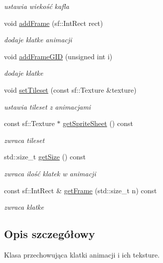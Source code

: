 \begin{DoxyCompactItemize}
\begin{DoxyCompactList}\small\item\em ustawia wiekość kafla \end{DoxyCompactList}\item 
void \hyperlink{class_animation_a486ee5fa2d40ae90f227a19866998c91}{add\-Frame} (sf\-::\-Int\-Rect rect)
\begin{DoxyCompactList}\small\item\em dodaje klatke animacji \end{DoxyCompactList}\item 
void \hyperlink{class_animation_ad55efa0c04a03239a8c176f1710b7a9b}{add\-Frame\-G\-I\-D} (unsigned int i)
\begin{DoxyCompactList}\small\item\em dodaje klatke \end{DoxyCompactList}\item 
void \hyperlink{class_animation_a8528dea500d55c9849ab6d3c30ae15eb}{set\-Tileset} (const sf\-::\-Texture \&texture)
\begin{DoxyCompactList}\small\item\em ustawia tileset z animacjami \end{DoxyCompactList}\item 
const sf\-::\-Texture $\ast$ \hyperlink{class_animation_aafed5696c35b893bb721aa1303d5e84f}{get\-Sprite\-Sheet} () const 
\begin{DoxyCompactList}\small\item\em zwraca tileset \end{DoxyCompactList}\item 
std\-::size\-\_\-t \hyperlink{class_animation_aa8dc627c1800fcad9b9e53c9a102ded3}{get\-Size} () const 
\begin{DoxyCompactList}\small\item\em zwraca ilość klatek w animacji \end{DoxyCompactList}\item 
const sf\-::\-Int\-Rect \& \hyperlink{class_animation_ad587678b331518e926b19b807b153daa}{get\-Frame} (std\-::size\-\_\-t n) const 
\begin{DoxyCompactList}\small\item\em zwraca klatke \end{DoxyCompactList}\end{DoxyCompactItemize}


\subsection{Opis szczegółowy}
Klasa przechowująca klatki animacji i ich teksture. 

